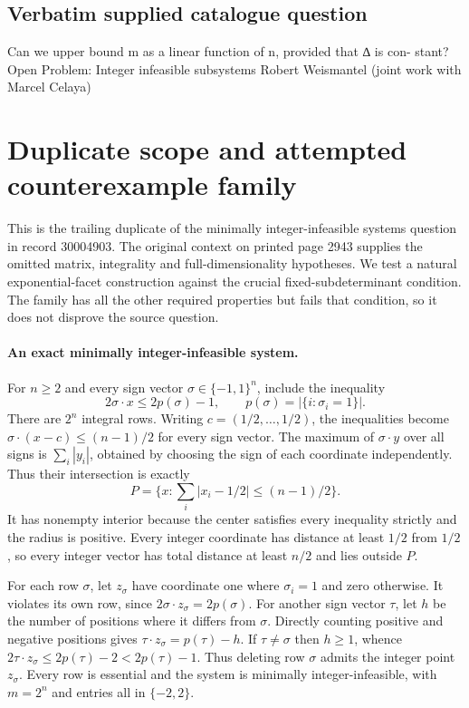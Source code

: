 \documentclass[11pt]{article}
\begin{document}
\subsection{Verbatim supplied catalogue question}
Can we upper bound m as a linear function of n, provided that ∆ is con- stant? Open Problem: Integer infeasible subsystems Robert Weismantel (joint work with Marcel Celaya)

\section{Duplicate scope and attempted counterexample family}
This is the trailing duplicate of the minimally integer-infeasible
systems question in record 30004903. The original context on printed
page 2943 supplies the omitted matrix, integrality and full-dimensionality
hypotheses. We test a natural exponential-facet construction against
the crucial fixed-subdeterminant condition. The family has all the
other required properties but fails that condition, so it does not
disprove the source question.

\paragraph{An exact minimally integer-infeasible system.}
For $n\ge2$ and every sign vector $\sigma\in\{-1,1\}^n$,
include the inequality
\[
2\sigma\cdot x\le2p(\sigma)-1,
\qquad p(\sigma)=|\{i:\sigma_i=1\}|.
\]
There are $2^n$ integral rows. Writing
$c=(1/2,\ldots,1/2)$, the inequalities become
$\sigma\cdot(x-c)\le(n-1)/2$ for every sign vector.
The maximum of $\sigma\cdot y$ over all signs is
$\sum_i|y_i|$, obtained by choosing the sign of each
coordinate independently. Thus their intersection is exactly
\[
P=\{x:\sum_i|x_i-1/2|\le(n-1)/2\}.
\]
It has nonempty interior because the center satisfies every
inequality strictly and the radius is positive. Every integer
coordinate has distance at least $1/2$ from $1/2$, so
every integer vector has total distance at least $n/2$ and
lies outside $P$.

For each row $\sigma$, let $z_\sigma$ have coordinate one
where $\sigma_i=1$ and zero otherwise. It violates its own
row, since $2\sigma\cdot z_\sigma=2p(\sigma)$.
For another sign vector $\tau$, let $h$ be the number of
positions where it differs from $\sigma$. Directly counting
positive and negative positions gives
$\tau\cdot z_\sigma=p(\tau)-h$. If $\tau\ne\sigma$
then $h\ge1$, whence
$2\tau\cdot z_\sigma\le2p(\tau)-2<2p(\tau)-1$.
Thus deleting row $\sigma$ admits the integer point
$z_\sigma$. Every row is essential and the system is minimally
integer-infeasible, with $m=2^n$ and entries all in $\{-2,2\}$.
\end{document}

